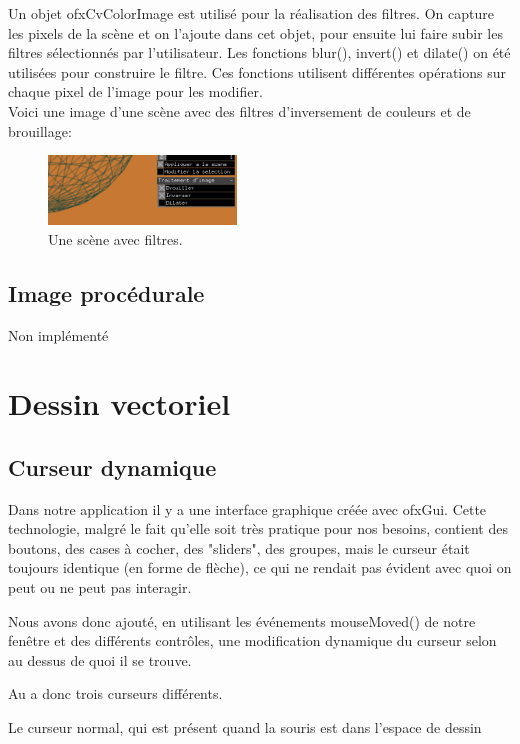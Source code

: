 Un objet ofxCvColorImage est utilisé pour la réalisation des filtres. On capture les pixels de la scène et on l’ajoute dans cet objet, pour ensuite lui faire subir les filtres sélectionnés par l’utilisateur. Les fonctions blur(), invert() et dilate() on été utilisées pour construire le filtre. Ces fonctions utilisent différentes opérations sur chaque pixel de l’image pour les modifier.\\

Voici une image d’une scène avec des filtres d’inversement de couleurs et de brouillage:\\
\begin{figure}[h]
	\centering
	\includegraphics[width=5cm]{fig/filters.png}
	\caption{Une scène avec filtres.}
	\label{fig:filtres}
\end{figure}


\subsection{Image procédurale}
Non implémenté

\newpage

\section{Dessin vectoriel}

\subsection{Curseur dynamique}

Dans notre application il y a une interface graphique créée avec ofxGui. Cette technologie, malgré le fait qu'elle soit très pratique pour nos besoins, contient des boutons, des cases à cocher, des "sliders", des groupes, mais le curseur était toujours identique (en forme de flèche), ce qui ne rendait pas évident avec quoi on peut ou ne peut pas interagir.

Nous avons donc ajouté, en utilisant les événements mouseMoved() de notre fenêtre et des différents contrôles, une modification dynamique du curseur selon au dessus de quoi il se trouve.

Au a donc trois curseurs différents.

Le curseur normal, qui est présent quand la souris est dans l'espace de dessin

